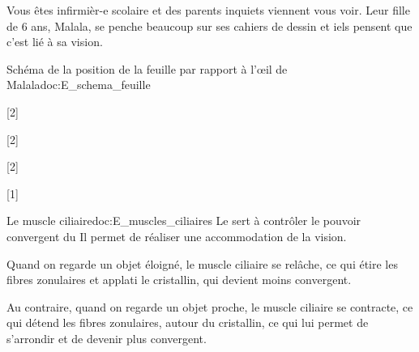 

Vous êtes infirmièr-e scolaire et des parents inquiets viennent vous voir. Leur fille de 6 ans, Malala, se penche beaucoup sur ses cahiers de dessin et iels pensent que c'est lié à sa vision.


\begin{doc}{Schéma de la position de la feuille par rapport à l’œil de Malala}{doc:E_schema_feuille}
  \centering
\end{doc}

[2]


[2]

[2]

\pasCorrection{
  \newpage
  \vspace*{-24pt}
}
[1]


\begin{doc}{Le muscle ciliaire}{doc:E_muscles_ciliaires}
  Le  sert à contrôler le pouvoir convergent du 
  Il permet de réaliser une accommodation de la vision.

  Quand on regarde un objet éloigné, le muscle ciliaire se relâche, ce qui étire les fibres zonulaires et applati le cristallin, qui devient moins convergent.

  Au contraire, quand on regarde un objet proche, le muscle ciliaire se contracte, ce qui détend les fibres zonulaires, autour du cristallin, ce qui lui permet de s'arrondir et de devenir plus convergent.
\end{doc}

